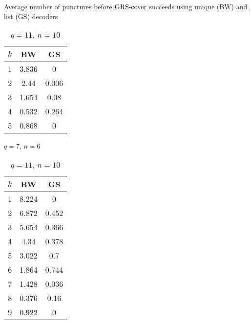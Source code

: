 \documentclass[conference]{IEEEtran}
\begin{document}
\begin{table}[!htbp]
    \caption{Average number of punctures before $\operatorname{GRS-cover}$ succeeds using unique (BW) and list (GS) decoders} 
    \begin{subtable}[t]{0.5\linewidth}
        \centering
        \begin{tabular}[t]{ccc}
            \toprule 
            $k$ & BW & GS \\
            \midrule 
            1 & 3.836 & 0 \\
            2 & 2.44 & 0.006 \\
            3 & 1.654 & 0.08 \\
            4 & 0.532 & 0.264 \\
            5 & 0.868 & 0 \\
            
            \bottomrule
    \end{tabular}
    \caption{$q = 7$, $n = 6$}
    \end{subtable}%
    \begin{subtable}[t]{0.5\linewidth}
        \centering
        \begin{tabular}[t]{ccc}
            \toprule 
            $k$ & BW & GS \\
            \midrule 
            1 & 8.224 & 0 \\
            2 & 6.872 & 0.452 \\
            3 & 5.654 & 0.366 \\
            4 & 4.34 & 0.378 \\
            5 & 3.022 & 0.7 \\
            6 & 1.864 & 0.744 \\ 
            7 & 1.428 & 0.036 \\
            8 & 0.376 & 0.16 \\
            9 & 0.922 & 0 \\
            \bottomrule
        \end{tabular}
        \caption{$q = 11$, $n = 10$}
        \end{subtable}
    \label{tab:punctures}
\end{table}
\end{document}
